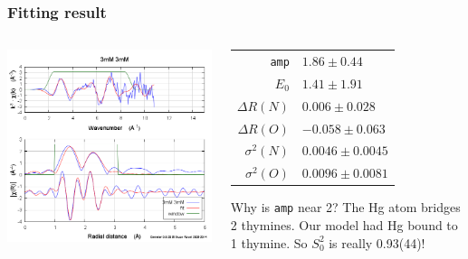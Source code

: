 \documentclass[10pt, xcolor=x11names, compress]{beamer}
\begin{document}
\begin{frame}
  \frametitle{Fitting result}
  \begin{columns}
    \begin{column}{0.5\linewidth}
      \includegraphics[width=\linewidth]{images/fit.png}
    \end{column}
    \begin{column}{0.5\linewidth}
      \begin{tabular}{rl}
        \texttt{amp} & $1.86\pm 0.44$ \\
        $E_0$ & $1.41\pm 1.91$\\
        $\Delta R(N)$ & $0.006\pm 0.028$\\
        $\Delta R(O)$ & $-0.058\pm 0.063$\\
        $\sigma^2(N)$ & $0.0046\pm 0.0045$\\
        $\sigma^2(O)$ & $0.0096\pm 0.0081$
      \end{tabular}

      \bigskip

      \begin{block}{Why is \texttt{amp} near 2?}
        The Hg atom bridges 2 thymines.  Our {\feff} model had Hg
        bound to 1 thymine.  So $S_0^2$ is really 0.93(44)!
      \end{block}

    \end{column}
  \end{columns}
\end{frame}
\end{document}
